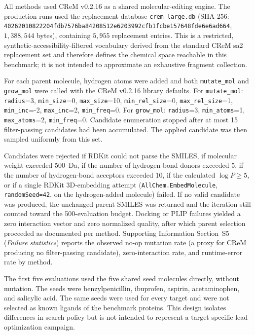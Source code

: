 \documentclass[journal=jcisd8,manuscript=article]{achemso}
\begin{document}
All methods used CReM v0.2.16\cite{polishchuk2020crem} as a shared molecular-editing engine. The production runs used the replacement database \texttt{crem\_large.db} (SHA-256: \texttt{40262010822204fdb7576ba842\allowbreak 08512e6203992cfb1fcbe1\allowbreak 57648fde6e6ad664}, $1{,}388{,}544$ bytes), containing $5{,}955$ replacement entries. This is a restricted, synthetic-accessibility-filtered vocabulary derived from the standard CReM sa2 replacement set and therefore defines the chemical space reachable in this benchmark; it is not intended to approximate an exhaustive fragment collection.

For each parent molecule, hydrogen atoms were added and both \texttt{mutate\_mol} and \texttt{grow\_mol} were called with the CReM v0.2.16 library defaults. For \texttt{mutate\_mol}: \texttt{radius}=3, \texttt{min\_size}=0, \texttt{max\_size}=10, \texttt{min\_rel\_size}=0, \texttt{max\_rel\_size}=1, \texttt{min\_inc}=-2, \texttt{max\_inc}=2, \texttt{min\_freq}=0. For \texttt{grow\_mol}: \texttt{radius}=3, \texttt{min\_atoms}=1, \texttt{max\_atoms}=2, \texttt{min\_freq}=0. Candidate enumeration stopped after at most 15 filter-passing candidates had been accumulated. The applied candidate was then sampled uniformly from this set.

Candidates were rejected if RDKit could not parse the SMILES, if molecular weight exceeded $500$~Da, if the number of hydrogen-bond donors exceeded $5$, if the number of hydrogen-bond acceptors exceeded $10$, if the calculated $\log P \geq 5$, or if a single RDKit 3D-embedding attempt (\texttt{AllChem.EmbedMolecule}, \texttt{randomSeed=42}, on the hydrogen-added molecule) failed. If no valid candidate was produced, the unchanged parent SMILES was returned and the iteration still counted toward the 500-evaluation budget. Docking or PLIP failures yielded a zero interaction vector and zero normalized quality, after which parent selection proceeded as documented per method. Supporting Information Section~S5 (\emph{Failure statistics}) reports the observed no-op mutation rate (a proxy for CReM producing no filter-passing candidate), zero-interaction rate, and runtime-error rate by method.

The first five evaluations used the five shared seed molecules directly, without mutation. The seeds were benzylpenicillin, ibuprofen, aspirin, acetaminophen, and salicylic acid. The same seeds were used for every target and were not selected as known ligands of the benchmark proteins. This design isolates differences in search policy but is not intended to represent a target-specific lead-optimization campaign.
\end{document}
